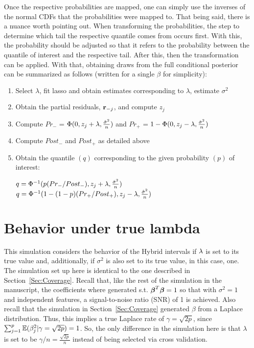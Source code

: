 \begin{appendices}


Once the respective probabilities are mapped, one can simply use the inverses of the normal CDFs that the probabilities were mapped to. That being said, there is a nuance worth pointing out. When transforming the probabilities, the step to determine which tail the respective quantile comes from occurs first. With this, the probability should be adjusted so that it refers to the probability between the quantile of interest and the respective tail. After this, then the transformation can be applied. With that, obtaining draws from the full conditional posterior can be summarized as follows (written for a single $\beta$ for simplicity):

\begin{enumerate}
  \item Select $\lambda$, fit lasso and obtain estimates corresponding to $\lambda$, estimate $\sigma^2$
	\item Obtain the partial residuals, $\mathbf{r}_{-j}$, and compute $z_j$
	\item Compute $Pr_{-}$ = $\Phi(0, z_j + \lambda, \frac{\hat{\sigma}^2}{n})$ and $Pr_{+}$ = $1 - \Phi(0, z_j - \lambda, \frac{\hat{\sigma}^2}{n})$
	\item Compute $Post_-$ and $Post_+$ as detailed above
	\item Obtain the quantile $(q)$ corresponding to the given probability $(p)$ of interest:
  \begin{algorithmic}
      \State $q = \Phi^{-1}(p(Pr_{-} / Post_{-}), z_j + \lambda, \frac{\hat{\sigma}^2}{n})$
    \Else
        \State $q = \Phi^{-1}(1 - (1 - p)(Pr_{+} / Post_{+}), z_j - \lambda, \frac{\hat{\sigma}^2}{n})$
    \EndIf
  \end{algorithmic}
\end{enumerate}

\newpage

\section{Behavior under true lambda}
\label{Sup:B}

This simulation considers the behavior of the Hybrid intervals if $\lambda$ is set to its true value and, additionally, if $\sigma^2$ is also set to its true value, in this case, one. The simulation set up here is identical to the one described in Section~\ref{Sec:Coverage}. Recall that, like the rest of the simulation in the manuscript, the coefficients where generated s.t. $\boldsymbol{\beta}^T\boldsymbol{\beta} = 1$ so that with $\sigma^2=1$ and independent features, a signal-to-noise ratio (SNR) of 1 is achieved. Also recall that the simulation in Section~\ref{Sec:Coverage} generated $\beta$ from a Laplace distribution. Thus, this implies a true Laplace rate of $\gamma=\sqrt{2p}$, since $\sum_{j=1}^p\mathbb{E}(\beta_j^2|\gamma=\sqrt{2p}) = 1$. So, the only difference in the simulation here is that $\lambda$ is set to be $\gamma / n = \frac{\sqrt{2p}}{n}$ instead of being selected via cross validation. 


\end{appendices}
